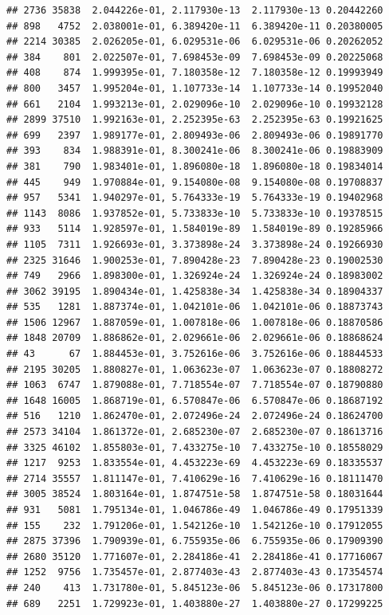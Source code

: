 \documentclass[
]{article}
\begin{document}
\begin{verbatim}
## 2736 35838  2.044226e-01, 2.117930e-13  2.117930e-13 0.20442260
## 898   4752  2.038001e-01, 6.389420e-11  6.389420e-11 0.20380005
## 2214 30385  2.026205e-01, 6.029531e-06  6.029531e-06 0.20262052
## 384    801  2.022507e-01, 7.698453e-09  7.698453e-09 0.20225068
## 408    874  1.999395e-01, 7.180358e-12  7.180358e-12 0.19993949
## 800   3457  1.995204e-01, 1.107733e-14  1.107733e-14 0.19952040
## 661   2104  1.993213e-01, 2.029096e-10  2.029096e-10 0.19932128
## 2899 37510  1.992163e-01, 2.252395e-63  2.252395e-63 0.19921625
## 699   2397  1.989177e-01, 2.809493e-06  2.809493e-06 0.19891770
## 393    834  1.988391e-01, 8.300241e-06  8.300241e-06 0.19883909
## 381    790  1.983401e-01, 1.896080e-18  1.896080e-18 0.19834014
## 445    949  1.970884e-01, 9.154080e-08  9.154080e-08 0.19708837
## 957   5341  1.940297e-01, 5.764333e-19  5.764333e-19 0.19402968
## 1143  8086  1.937852e-01, 5.733833e-10  5.733833e-10 0.19378515
## 933   5114  1.928597e-01, 1.584019e-89  1.584019e-89 0.19285966
## 1105  7311  1.926693e-01, 3.373898e-24  3.373898e-24 0.19266930
## 2325 31646  1.900253e-01, 7.890428e-23  7.890428e-23 0.19002530
## 749   2966  1.898300e-01, 1.326924e-24  1.326924e-24 0.18983002
## 3062 39195  1.890434e-01, 1.425838e-34  1.425838e-34 0.18904337
## 535   1281  1.887374e-01, 1.042101e-06  1.042101e-06 0.18873743
## 1506 12967  1.887059e-01, 1.007818e-06  1.007818e-06 0.18870586
## 1848 20709  1.886862e-01, 2.029661e-06  2.029661e-06 0.18868624
## 43      67  1.884453e-01, 3.752616e-06  3.752616e-06 0.18844533
## 2195 30205  1.880827e-01, 1.063623e-07  1.063623e-07 0.18808272
## 1063  6747  1.879088e-01, 7.718554e-07  7.718554e-07 0.18790880
## 1648 16005  1.868719e-01, 6.570847e-06  6.570847e-06 0.18687192
## 516   1210  1.862470e-01, 2.072496e-24  2.072496e-24 0.18624700
## 2573 34104  1.861372e-01, 2.685230e-07  2.685230e-07 0.18613716
## 3325 46102  1.855803e-01, 7.433275e-10  7.433275e-10 0.18558029
## 1217  9253  1.833554e-01, 4.453223e-69  4.453223e-69 0.18335537
## 2714 35557  1.811147e-01, 7.410629e-16  7.410629e-16 0.18111470
## 3005 38524  1.803164e-01, 1.874751e-58  1.874751e-58 0.18031644
## 931   5081  1.795134e-01, 1.046786e-49  1.046786e-49 0.17951339
## 155    232  1.791206e-01, 1.542126e-10  1.542126e-10 0.17912055
## 2875 37396  1.790939e-01, 6.755935e-06  6.755935e-06 0.17909390
## 2680 35120  1.771607e-01, 2.284186e-41  2.284186e-41 0.17716067
## 1252  9756  1.735457e-01, 2.877403e-43  2.877403e-43 0.17354574
## 240    413  1.731780e-01, 5.845123e-06  5.845123e-06 0.17317800
## 689   2251  1.729923e-01, 1.403880e-27  1.403880e-27 0.17299225

\end{verbatim}
\end{document}
